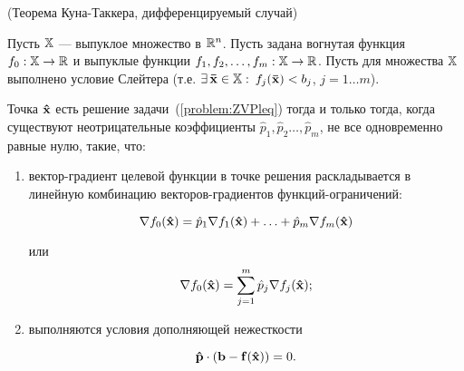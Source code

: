 \begin{teop}(Теорема Куна-Таккера, дифференцируемый случай)

Пусть $\mathbb{X}$ --- выпуклое множество в $\mathbb{R}^n$. Пусть задана
вогнутая функция $f_0: \mathbb{X} \to \mathbb{R}$ и выпуклые функции $f_1, f_2,
\ldots, f_m: \mathbb{X} \to \mathbb{R}$. Пусть для множества $\mathbb{X}$ выполнено
условие Слейтера (т.е. $\exists \, \mathbf{\bar x} \in \mathbb{X}:$
${f_j(\mathbf{\bar x}) < b_j}$, ${j=1 \ldots m}$).

Точка $\mathbf{\hat x}$ есть решение задачи~(\ref{problem:ZVPleq}) тогда
и только тогда, когда существуют неотрицательные коэффициенты $\hat
p_1, \hat p_2 \ldots, \hat p_m$, не все одновременно равные нулю,
такие, что:

\begin{enumerate}
\renewcommand{\theenumi}{(\arabic{enumi})}

\item вектор-градиент целевой функции в точке решения раскладывается в линейную
комбинацию векторов-градиентов функций-ограничений:

\[
\nabla f_0(\mathbf{\hat x})= \hat p_1 \nabla f_1(\mathbf{\hat x})+ \ldots +
\hat p_m \nabla f_m(\mathbf{\hat x})
\]

или
\[
\nabla f_0(\mathbf{\hat x})=  \sum_{j=1}^{m} \hat p_j \nabla
f_j(\mathbf{\hat x});
\]

\item выполняются условия дополняющей нежесткости

\[\mathbf{\hat p} \cdot (\mathbf{b} - \mathbf{f}(\mathbf{\hat x}))=0.\]
\end{enumerate}
\end{teop}

